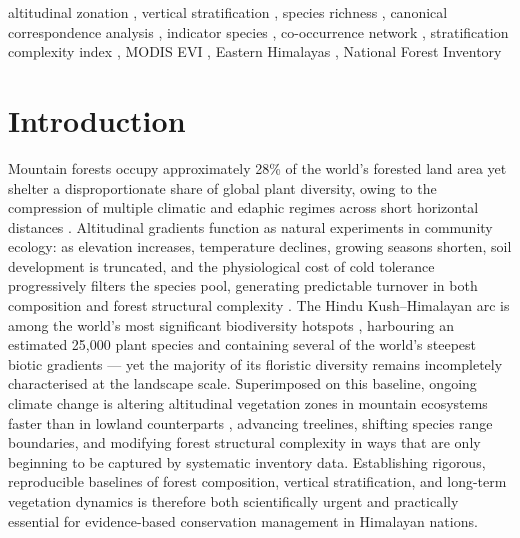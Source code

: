 \documentclass[review,12pt,a4paper]{elsarticle}
\begin{document}
\begin{frontmatter}
\begin{keyword}
altitudinal zonation \sep
vertical stratification \sep
species richness \sep
canonical correspondence analysis \sep
indicator species \sep
co-occurrence network \sep
stratification complexity index \sep
MODIS EVI \sep
Eastern Himalayas \sep
National Forest Inventory
\end{keyword}

\end{frontmatter}

\section{Introduction}
\label{sec:intro}

Mountain forests occupy approximately 28\% of the world's forested land
area yet shelter a disproportionate share of global plant diversity, owing
to the compression of multiple climatic and edaphic regimes across short
horizontal distances \citep{korner2012}. Altitudinal gradients function as
natural experiments in community ecology: as elevation increases, temperature
declines, growing seasons shorten, soil development is truncated, and the
physiological cost of cold tolerance progressively filters the species pool,
generating predictable turnover in both composition and forest structural
complexity \citep{rahbek1995}. The Hindu Kush--Himalayan arc is among the
world's most significant biodiversity hotspots \citep{myers2000}, harbouring
an estimated 25{,}000 plant species and containing several of the world's
steepest biotic gradients --- yet the majority of its floristic diversity
remains incompletely characterised at the landscape scale. Superimposed on
this baseline, ongoing climate change is altering altitudinal vegetation zones
in mountain ecosystems faster than in lowland counterparts \citep{pepin2015},
advancing treelines, shifting species range boundaries, and modifying forest
structural complexity in ways that are only beginning to be captured by
systematic inventory data. Establishing rigorous, reproducible baselines of
forest composition, vertical stratification, and long-term vegetation dynamics
is therefore both scientifically urgent and practically essential for
evidence-based conservation management in Himalayan nations.
\end{document}
